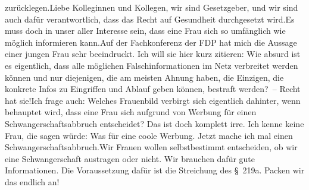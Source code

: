 \documentclass{article}
\begin{document}
zurücklegen.Liebe Kolleginnen und Kollegen, wir sind Gesetzgeber, und wir sind auch dafür verantwortlich, dass das Recht auf Gesundheit durchgesetzt wird.Es muss doch in unser aller Interesse sein, dass eine Frau sich so umfänglich wie möglich informieren kann.Auf der Fachkonferenz der FDP hat mich die Aussage einer jungen Frau sehr beeindruckt. Ich will sie hier kurz zitieren: Wie absurd ist es eigentlich, dass alle möglichen Falschinformationen im Netz verbreitet werden können und nur diejenigen, die am meisten Ahnung haben, die Einzigen, die konkrete Infos zu Eingriffen und Ablauf geben können, bestraft werden? – Recht hat sie!Ich frage auch: Welches Frauenbild verbirgt sich eigentlich dahinter, wenn behauptet wird, dass eine Frau sich aufgrund von Werbung für einen Schwangerschaftsabbruch entscheidet? Das ist doch komplett irre. Ich kenne keine Frau, die sagen würde: Was für eine coole Werbung. Jetzt mache ich mal einen Schwangerschaftsabbruch.Wir Frauen wollen selbstbestimmt entscheiden, ob wir eine Schwangerschaft austragen oder nicht. Wir brauchen dafür gute Informationen. Die Voraussetzung dafür ist die Streichung des § 219a. Packen wir das endlich an!
\end{document}
